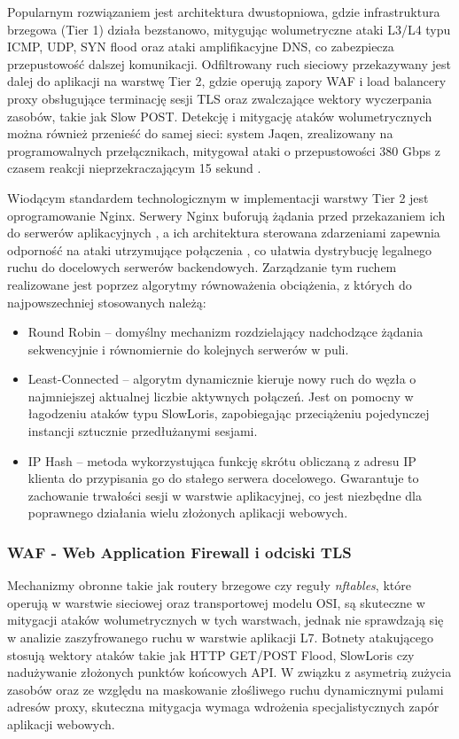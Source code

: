 \documentclass[a4paper,12pt]{article}
\begin{document}
Popularnym rozwiązaniem jest architektura dwustopniowa, gdzie infrastruktura brzegowa (Tier 1) działa bezstanowo, mitygując wolumetryczne ataki L3/L4 typu ICMP, UDP, SYN flood oraz ataki amplifikacyjne DNS, co zabezpiecza przepustowość dalszej komunikacji. Odfiltrowany ruch sieciowy przekazywany jest dalej do aplikacji na warstwę Tier 2, gdzie operują zapory WAF i load balancery proxy obsługujące terminację sesji TLS oraz zwalczające wektory wyczerpania zasobów, takie jak Slow POST. Detekcję i mitygację ataków wolumetrycznych można również przenieść do samej sieci: system Jaqen, zrealizowany na programowalnych przełącznikach, mitygował ataki o przepustowości 380 Gbps z czasem reakcji nieprzekraczającym 15 sekund \cite{liu2021jaqen}.

Wiodącym standardem technologicznym w implementacji warstwy Tier 2 jest oprogramowanie Nginx. Serwery Nginx buforują żądania przed przekazaniem ich do serwerów aplikacyjnych \cite{nginx_proxy}, a ich architektura sterowana zdarzeniami zapewnia odporność na ataki utrzymujące połączenia \cite{sikora2021generator}, co ułatwia dystrybucję legalnego ruchu do docelowych serwerów backendowych. Zarządzanie tym ruchem realizowane jest poprzez algorytmy równoważenia obciążenia, z których do najpowszechniej stosowanych należą:
\begin{itemize}
    \item Round Robin – domyślny mechanizm rozdzielający nadchodzące żądania sekwencyjnie i równomiernie do kolejnych serwerów w puli.
    \item Least-Connected – algorytm dynamicznie kieruje nowy ruch do węzła o najmniejszej aktualnej liczbie aktywnych połączeń. Jest on pomocny w łagodzeniu ataków typu SlowLoris, zapobiegając przeciążeniu pojedynczej instancji sztucznie przedłużanymi sesjami.
    \item IP Hash – metoda wykorzystująca funkcję skrótu obliczaną z adresu IP klienta do przypisania go do stałego serwera docelowego. Gwarantuje to zachowanie trwałości sesji w warstwie aplikacyjnej, co jest niezbędne dla poprawnego działania wielu złożonych aplikacji webowych.
\end{itemize}
\subsubsection{WAF - Web Application Firewall i odciski TLS}
Mechanizmy obronne takie jak routery brzegowe czy reguły \textit{nftables}, które operują w warstwie sieciowej oraz transportowej modelu OSI, są skuteczne w mitygacji ataków wolumetrycznych w tych warstwach, jednak nie sprawdzają się w analizie zaszyfrowanego ruchu w warstwie aplikacji L7. Botnety atakującego stosują wektory ataków takie jak HTTP GET/POST Flood, SlowLoris czy nadużywanie złożonych punktów końcowych API. W związku z asymetrią zużycia zasobów oraz ze względu na maskowanie złośliwego ruchu dynamicznymi pulami adresów proxy, skuteczna mitygacja wymaga wdrożenia specjalistycznych zapór aplikacji webowych.
\end{document}
